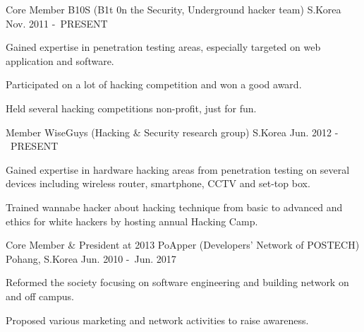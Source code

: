 

\begin{cventries}

  \cventry
    {Core Member} %
    {B10S (B1t 0n the Security, Underground hacker team)} %
    {S.Korea} %
    {Nov. 2011 -\ PRESENT} %
    {
      \begin{cvitems} %
        \item {Gained expertise in penetration testing areas, especially targeted on web application and software.}
        \item {Participated on a lot of hacking competition and won a good award.}
        \item {Held several hacking competitions non-profit, just for fun.}
      \end{cvitems}
    }

  \cventry
    {Member} %
    {WiseGuys (Hacking \& Security research group)} %
    {S.Korea} %
    {Jun. 2012 -\ PRESENT} %
    {
      \begin{cvitems} %
        \item {Gained expertise in hardware hacking areas from penetration testing on several devices including wireless router, smartphone, CCTV and set-top box.}
        \item {Trained wannabe hacker about hacking technique from basic to advanced and ethics for white hackers by hosting annual Hacking Camp.}
      \end{cvitems}
    }

  \cventry
    {Core Member \& President at 2013} %
    {PoApper (Developers' Network of POSTECH)} %
    {Pohang, S.Korea} %
    {Jun. 2010 -\ Jun. 2017} %
    {
      \begin{cvitems} %
        \item {Reformed the society focusing on software engineering and building network on and off campus.}
        \item {Proposed various marketing and network activities to raise awareness.}
      \end{cvitems}
    }


\end{cventries}
